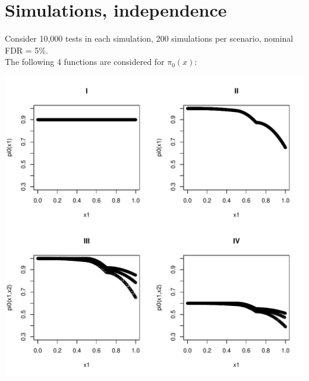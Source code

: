 \documentclass{article}\usepackage[]{graphicx}\usepackage[]{color}
\makeatletter
\def\maxwidth{ %
  \ifdim\Gin@nat@width>\linewidth
    \linewidth
  \else
    \Gin@nat@width
  \fi
}
\newenvironment{knitrout}{}{} %
\makeatother
\begin{document}
\section*{Simulations, independence}

Consider 10,000 tests in each simulation, 200 simulations per scenario, nominal FDR = 5\%.
\\
The following 4 functions are considered for $\pi_0(x)$:
\begin{knitrout}
\color{fgcolor}

{\centering \includegraphics[width=\maxwidth]{Figures/unnamed-chunk-3-1} 

}



\end{knitrout}

\clearpage
\end{document}
